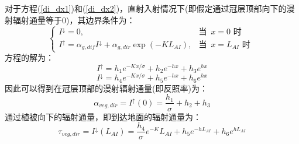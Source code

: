 对于方程(\ref{di_dx1})和(\ref{di_dx2})，直射入射情况下(即假定通过冠层顶部向下的漫射辐射通量等于0)，其边界条件为：
\begin{equation}
\begin{cases}
I^{\downarrow} =0, &\text {当 }\, x=0 \text { 时 } \\
I^{\uparrow} =\alpha_{g, dif} I^{\downarrow}+\alpha_{g, dir} \exp \left(-K L_{AI} \right), &\text {当 }\, x=L_{AI} \text { 时 }
\end{cases}
\end{equation}
方程的解为：
\begin{equation}\label{eq:2s_dir_up}
I^{\uparrow}=h_{1} e^{-K x / \sigma}+h_{2} e^{-h x}+h_{3} e^{h x}
\end{equation}
%
\begin{equation}\label{eq:2s_dir_dw}
I^{\downarrow}=h_{4} e^{-K x / \sigma}+h_{5} e^{-h x}+h_{6} e^{h x}
\end{equation}
因此可以得到在冠层顶部的漫射辐射通量(即反照率)为：
\begin{equation}
\alpha_{veg, dir}=I^{\uparrow}(0)=\frac{h_{1}}{\sigma}+h_{2}+h_{3}
\end{equation}
通过植被向下的辐射通量，即到达地面的辐射通量为：
\begin{equation}
\tau_{veg, dir}=I^{\downarrow}\left(L_{A I}\right)=\frac{h_{4}}{\sigma} e^{-K} L_{A I}+h_{5} e^{-h L_{A I}}+h_{6} e^{h L_{A I}}
\end{equation}

